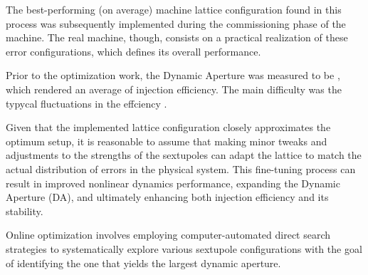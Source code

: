The best-performing (on average) machine lattice configuration found in this process was subsequently implemented during the commissioning phase of the machine. The real machine, though, consists on a practical realization of these error configurations, which defines its overall performance.

Prior to the optimization work, the Dynamic Aperture was measured to be , which rendered an average of  injection efficiency. The main difficulty was the typycal fluctuations in the effciency .

Given that the implemented lattice configuration closely approximates the optimum setup, it is reasonable to assume that making minor tweaks and adjustments to the strengths of the sextupoles can adapt the lattice to match the actual distribution of errors in the physical system. This fine-tuning process can result in improved nonlinear dynamics performance, expanding the Dynamic Aperture (DA), and ultimately enhancing both injection efficiency and its stability.

Online optimization involves employing computer-automated direct search strategies to systematically explore various sextupole configurations with the goal of identifying the one that yields the largest dynamic aperture.
